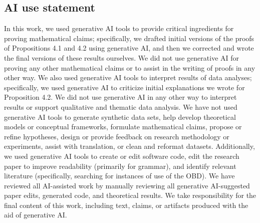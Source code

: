 \documentclass[twoside]{article}
\theoremstyle{definition}
\begin{document}






\subsection*{AI use statement}
In this work, we used generative AI tools to provide critical ingredients for proving mathematical claims; specifically, we drafted initial versions of the proofs of Propositions 4.1 and 4.2 using generative AI, and then we corrected and wrote the final versions of these results ourselves. We did not use generative AI for proving any other mathematical claims or to assist in the writing of proofs in any other way.
We also used generative AI tools to interpret results of data analyses; specifically, we used generative AI to criticize initial explanations we wrote for Proposition 4.2. We did not use generative AI in any other way to interpret results or support qualitative and thematic data analysis.
We have not used generative AI tools to generate synthetic data sets, help develop theoretical models or conceptual frameworks, formulate mathematical claims, propose or refine hypotheses, design or provide feedback on research methodology or experiments,  assist with translation, or clean and reformat datasets.
Additionally, we used generative AI tools to create or edit software code, edit the research paper to improve readability (primarily for grammar), and identify relevant literature (specifically, searching for instances of use of the OBD).
We have reviewed all AI-assisted work by manually reviewing all generative AI-suggested paper edits, generated code, and theoretical results.
We take responsibility for the final content of this work, including text, claims, or artifacts produced with the aid of generative AI.




\clearpage
\appendix
\thispagestyle{empty}
\onecolumn







\end{document}

